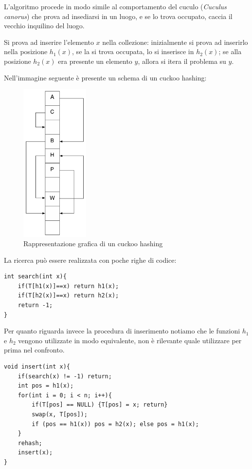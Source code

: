 \documentclass[a4paper,11pt]{book}
\begin{document}
L'algoritmo procede in modo simile al comportamento del cuculo (\emph{Cuculus canorus}) che prova ad insediarsi in un luogo, e se lo trova occupato, caccia il vecchio inquilino del luogo.

Si prova ad inserire l'elemento $x$ nella collezione: inizialmente si prova ad inserirlo nella posizione $h_1(x)$, se la si trova occupata, lo si inserisce in $h_2(x)$; se alla posizione $h_2(x)$ era presente un elemento $y$, allora si itera il problema su $y$.

Nell'immagine seguente \`e presente un schema di un cuckoo hashing:


\begin{figure}
\centering
\includegraphics[height=8cm]{cuckoo.png}
\caption{Rappresentazione grafica di un cuckoo hashing}
\end{figure}

La ricerca pu\`o essere realizzata con poche righe di codice:

\begin{lstlisting}
int search(int x){
	if(T[h1(x)]==x) return h1(x);
	if(T[h2(x)]==x) return h2(x);
	return -1;
}
\end{lstlisting}

Per quanto riguarda invece la procedura di inserimento notiamo che le funzioni $h_1$ e $h_2$ vengono utilizzate in modo equivalente, non \`e rilevante quale utilizzare per prima nel confronto.

\begin{lstlisting}
void insert(int x){
	if(search(x) != -1) return;
	int pos = h1(x);
	for(int i = 0; i < n; i++){
		if(T[pos] == NULL) {T[pos] = x; return}
		swap(x, T[pos]);
		if (pos == h1(x)) pos = h2(x); else pos = h1(x);	
	}
	rehash;
	insert(x);
}	
\end{lstlisting}
\end{document}
